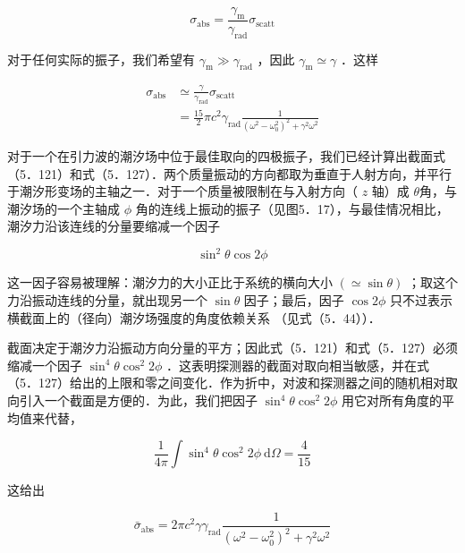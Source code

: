 \begin{equation*}
	\sigma_{\mathrm{abs}}=\frac{\gamma_{\mathrm{m}}}{\gamma_{\mathrm{rad}}} \sigma_{\mathrm{scatt}} \tag{5.125}
\end{equation*}


对于任何实际的振子，我们希望有 $\gamma_{\mathrm{m}} \gg \gamma_{\mathrm{rad}}$ ，因此 $\gamma_{\mathrm{m}} \simeq \gamma$ ．这样


\begin{align*}
	\sigma_{\mathrm{abs}} & \simeq \frac{\gamma}{\gamma_{\mathrm{rad}}} \sigma_{\mathrm{scatt}}  \tag{5.126}\\
	& =\frac{15}{2} \pi c^{2} \gamma_{\mathrm{rad}} \frac{1}{\left(\omega^{2}-\omega_{0}^{2}\right)^{2}+\gamma^{2} \omega^{2}} \tag{5.127}
\end{align*}



对于一个在引力波的潮汐场中位于最佳取向的四极振子，我们已经计算出截面式（5．121）和式（5．127）．两个质量振动的方向都取为垂直于人射方向，并平行于潮汐形变场的主轴之一．对于一个质量被限制在与入射方向（ $z$ 轴）成 $\theta$角，与潮汐场的一个主轴成 $\phi$ 角的连线上振动的振子（见图5．17），与最佳情况相比，潮汐力沿该连线的分量要缩减一个因子


\begin{equation*}
	\sin ^{2} \theta \cos 2 \phi \tag{5.128}
\end{equation*}


这一因子容易被理解：潮汐力的大小正比于系统的横向大小 $(\simeq \sin \theta)$ ；取这个力沿振动连线的分量，就出现另一个 $\sin \theta$ 因子；最后，因子 $\cos 2 \phi$ 只不过表示横截面上的（径向）潮汐场强度的角度依赖关系 （见式（5．44））．

截面决定于潮汐力沿振动方向分量的平方；因此式（5．121）和式（5．127）必须缩减一个因子 $\sin ^{4} \theta \cos ^{2} 2 \phi$ ．这表明探测器的截面对取向相当敏感，并在式（5．127）给出的上限和零之间变化．作为折中，对波和探测器之间的随机相对取向引入一个截面是方便的．为此，我们把因子 $\sin ^{4} \theta \cos ^{2} 2 \phi$ 用它对所有角度的平均值来代替，


\begin{equation*}
	\frac{1}{4 \pi} \int \sin ^{4} \theta \cos ^{2} 2 \phi \mathrm{~d} \Omega=\frac{4}{15} \tag{5.129}
\end{equation*}


这给出


\begin{equation*}
	\bar{\sigma}_{\mathrm{abs}}=2 \pi c^{2} \gamma \gamma_{\mathrm{rad}} \frac{1}{\left(\omega^{2}-\omega_{0}^{2}\right)^{2}+\gamma^{2} \omega^{2}} \tag{5.130}
\end{equation*}


